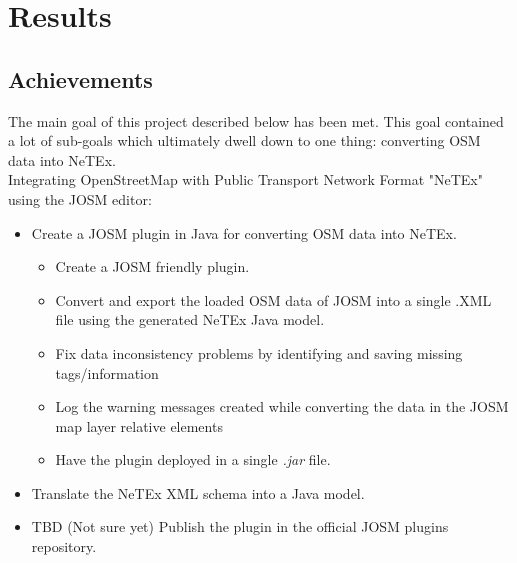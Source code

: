 \chapter{Results}
\section{Achievements}
The main goal of this project described below has been met. This goal contained a lot of sub-goals which ultimately dwell down to one thing: converting OSM data into NeTEx.\\
\newline
Integrating OpenStreetMap with Public Transport Network Format "NeTEx" using the JOSM editor:
\begin{itemize}
	\item{Create a JOSM plugin in Java for converting OSM data into NeTEx.}
	\begin{itemize}
		\item{Create a JOSM friendly plugin.}
		\item{Convert and export the loaded OSM data of JOSM into a single .XML file using the generated NeTEx Java model.}
		\item{Fix data inconsistency problems by identifying and saving missing tags/information}
		\item{Log the warning messages created while converting the data in the JOSM map layer relative elements}
		\item{Have the plugin deployed in a single \textit{.jar} file.}
	\end{itemize}
	\item{Translate the NeTEx XML schema into a Java model.}
	\item{TBD (Not sure yet) Publish the plugin in the official JOSM plugins repository.}
\end{itemize}
\newpage
